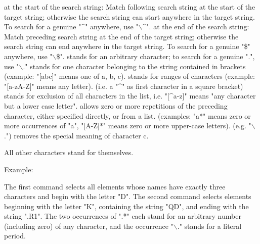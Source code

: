 \begin{madlist}
    at the start of the search string: Match
     following search string at the start of the target string;
     otherwise the search string can start anywhere in the target
     string. To search for a  genuine "\textasciicircum" anywhere, use
     "$\backslash$\textasciicircum".  
    at the end of the search string: Match preceding search
     string at the end of the target string; otherwise the search string
     can end anywhere in the target string. To search for a  genuine
     "\$" anywhere, use "$\backslash$\$".
    stands for an arbitrary character; to search for a genuine
     ".", use "$\backslash$."
    stands for one character belonging to the string
     contained in brackets (example: "[abc]" means one of a, b, c).  
    stands for ranges of characters (example:
     "[a-zA-Z]" means any letter).  
    (i.e. a "\textasciicircum" as first
     character in a square bracket) stands for exclusion of all
     characters in the list, i.e. "[\textasciicircum a-z]" means "any
     character but a lower case letter". 
    allows zero or more repetitions of the preceding
     character, either specified directly, or from a list. (examples:
     "a*" means zero or more occurrences of "a",  "[A-Z]*" means zero or
     more upper-case letters).  
     (e.g. "$\backslash$.") removes the special
     meaning of character c.  
\end{madlist}

All other characters stand for themselves. 


Example: 
 
The first command selects all elements whose names have exactly three
characters and begin with the letter "D". The second command selects
elements beginning with the letter "K", containing the string "QD", and
ending with the string ".R1". The two occurrences of ".*" each stand for
an arbitrary number (including zero) of any character, and the
occurrence "$\backslash$." stands for a literal period.  



